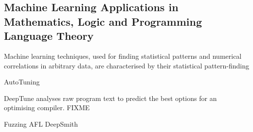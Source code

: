\subsection{Machine Learning Applications in Mathematics, Logic and Programming Language Theory}

Machine learning techniques, used for finding statistical patterns and numerical
correlations in arbitrary data, are characterised by their statistical pattern-finding

AutoTuning

DeepTune analyses raw program text to predict the best options for an optimising
compiler. FIXME

Fuzzing AFL DeepSmith
